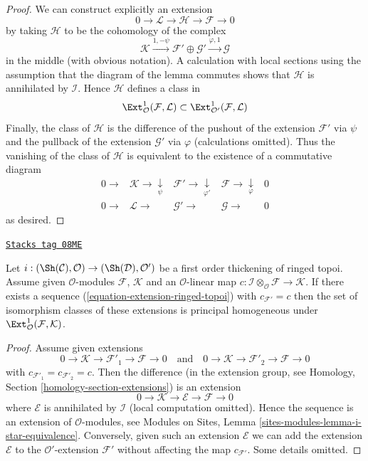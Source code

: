 \begin{proof}
We can construct explicitly an extension
$$
0 \to \mathcal{L} \to \mathcal{H} \to \mathcal{F} \to 0
$$
by taking $\mathcal{H}$ to be the cohomology of the complex
$$
\mathcal{K}
\xrightarrow{1, - \psi}
\mathcal{F}' \oplus \mathcal{G}' \xrightarrow{\varphi, 1}
\mathcal{G}
$$
in the middle (with obvious notation). A calculation with local sections
using the assumption that the diagram of the lemma commutes
shows that $\mathcal{H}$ is annihilated by $\mathcal{I}$. Hence
$\mathcal{H}$ defines a class in
$$
\Ext^1_\mathcal{O}(\mathcal{F}, \mathcal{L})
\subset
\Ext^1_{\mathcal{O}'}(\mathcal{F}, \mathcal{L})
$$
Finally, the class of $\mathcal{H}$ is the difference of the pushout
of the extension $\mathcal{F}'$ via $\psi$ and the pullback
of the extension $\mathcal{G}'$ via $\varphi$ (calculations omitted).
Thus the vanishing of the class of $\mathcal{H}$ is equivalent to the
existence of a commutative diagram
$$
\begin{array}{ccccc}0 \longrightarrow & \mathcal{K} \longrightarrow\underset{\psi}{\downarrow} & \mathcal{F}' \longrightarrow\underset{\varphi'}{\downarrow} & \mathcal{F} \longrightarrow\underset{\varphi}{\downarrow} & 0 \\ 0 \longrightarrow & \mathcal{L} \longrightarrow & \mathcal{G}' \longrightarrow & \mathcal{G} \longrightarrow & 0\end{array}
$$
as desired.
\end{proof}

\begin{lemma}
\label{defos-lemma-inf-ext-ringed-topoi}
\href{https://stacks.math.columbia.edu/tag/08ME}{\texttt{Stacks tag 08ME}}

Let $i : (\Sh(\mathcal{C}), \mathcal{O}) \to (\Sh(\mathcal{D}), \mathcal{O}')$
be a first order thickening of ringed topoi. Assume given
$\mathcal{O}$-modules $\mathcal{F}$, $\mathcal{K}$
and an $\mathcal{O}$-linear map
$c : \mathcal{I} \otimes_\mathcal{O} \mathcal{F} \to \mathcal{K}$.
If there exists a sequence (\ref{equation-extension-ringed-topoi}) with
$c_{\mathcal{F}'} = c$ then the set of isomorphism classes of these
extensions is principal homogeneous under
$\Ext^1_\mathcal{O}(\mathcal{F}, \mathcal{K})$.
\end{lemma}

\begin{proof}
Assume given extensions
$$
0 \to \mathcal{K} \to \mathcal{F}'_1 \to \mathcal{F} \to 0
\quad\text{and}\quad
0 \to \mathcal{K} \to \mathcal{F}'_2 \to \mathcal{F} \to 0
$$
with $c_{\mathcal{F}'_1} = c_{\mathcal{F}'_2} = c$. Then the difference
(in the extension group, see
Homology, Section \ref{homology-section-extensions})
is an extension
$$
0 \to \mathcal{K} \to \mathcal{E} \to \mathcal{F} \to 0
$$
where $\mathcal{E}$ is annihilated by $\mathcal{I}$ (local computation
omitted). Hence the sequence is an extension of $\mathcal{O}$-modules,
see Modules on Sites, Lemma \ref{sites-modules-lemma-i-star-equivalence}.
Conversely, given such an extension $\mathcal{E}$ we can add the extension
$\mathcal{E}$ to the $\mathcal{O}'$-extension $\mathcal{F}'$ without
affecting the map $c_{\mathcal{F}'}$. Some details omitted.
\end{proof}

